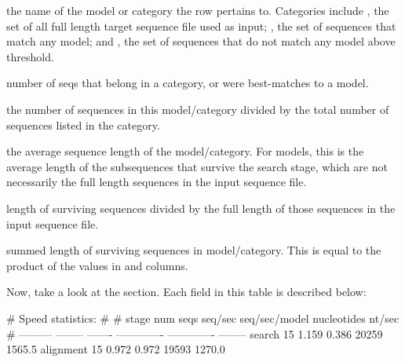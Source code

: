 \begin{wideitem}
\item[\emprog{model or category}] the name of the model or category
  the row pertains to. Categories include , the set of 
  all full length target sequence file used as input; ,
  the set of sequences that match any model; and , the set of
  sequences that do not match any model above threshold. 

\item[\emprog{number of seqs}] number of seqs that belong in a
  category, or were best-matches to a model.

\item[\emprog{fraction of total}] the number of sequences in this
  model/category divided by the total number of sequences listed in the
   category.

\item[\emprog{average length}] the average sequence length of the
  model/category. For models, this is the average length of the
  subsequences that survive the search stage, which are not
  necessarily the full length sequences in the input sequence file.

\item[\emprog{average coverage}] length of surviving sequences
  divided by the full length of those sequences in the input sequence
  file. 

\item[\emprog{nucleotides}] summed length of surviving sequences in
  model/category. This is equal to the product of the values in
   and  columns.
\end{wideitem}

Now, take a look at the  section. Each field in
this table is described below:

\begin{sreoutput}
# Speed statistics:
#
# stage      num seqs  seq/sec  seq/sec/model    nucleotides    nt/sec
# ---------  --------  -------  -------------  -------------  --------
  search           15    1.159          0.386          20259    1565.5
  alignment        15    0.972          0.972          19593    1270.0
\end{sreoutput}

